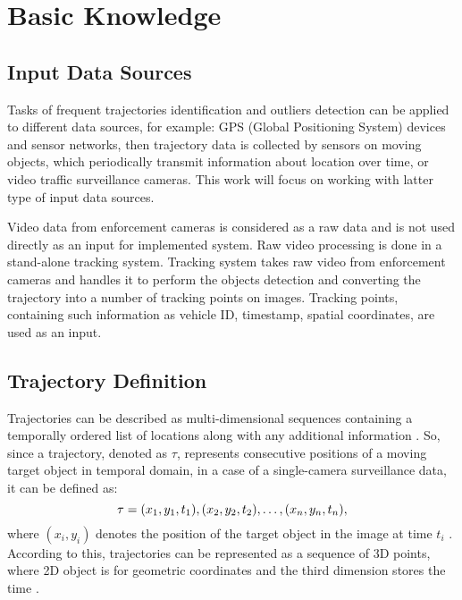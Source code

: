 \chapter{Basic Knowledge}
\label{ch:Basic Knowledge (done)}


\section{Input Data Sources}
Tasks of frequent trajectories identification and outliers detection can be applied to different data sources, for example: GPS (Global Positioning System) devices and sensor networks, then trajectory data is collected by sensors on moving objects, which periodically transmit information about location over time, or video traffic surveillance cameras. This work will focus on working with latter type of input data sources.

Video data from enforcement cameras is considered as a raw data and is not used directly as an input for implemented system. Raw video processing is done in a stand-alone tracking system. Tracking system takes raw video from enforcement cameras and handles it to perform the objects detection and converting the trajectory into a number of tracking points on images. Tracking points, containing such information as vehicle ID, timestamp, spatial coordinates, are used as an input.

\section{Trajectory Definition}

Trajectories can be described as multi-dimensional sequences containing a temporally ordered list of locations along with any additional information \cite{article:1_survey_stdm}. So, since a trajectory, denoted as $\tau$, represents consecutive positions of a moving target object in temporal domain, in a case of a single-camera surveillance data, it can be defined as:
\begin{equation}
	\tau={(x_1, y_1, t_1), (x_2, y_2, t_2), \ldots, (x_n, y_n, t_n)}\\[3pt],
\end{equation}
where $(x_i, y_i)$ denotes the position of the target object in the image at time $t_i$ \cite{article:5_survey_tbsa}. According to this, trajectories can be represented as a sequence of 3D points, where 2D object is for geometric coordinates and the third dimension stores the time \cite{article:25_dhr_mvt_eesd}.

